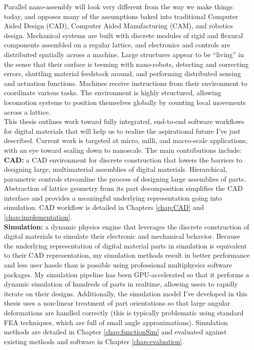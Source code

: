 {Parallel nano-assembly will look very different from the way we make things today, and opposes many of the assumptions baked into traditional Computer Aided Design (CAD),  Computer Aided Manufacturing (CAM), and robotics design.  Mechanical systems are built with discrete modules of rigid and flexural components assembled on a regular lattice, and electronics and controls are distributed spatially across a machine.  Large structures appear to be ``living'' in the sense that their surface is teeming with nano-robots, detecting and correcting errors, shuttling material feedstock around, and performing distributed sensing and actuation functions.  Machines receive instructions from their environment to coordinate various tasks.  The environment is highly structured, allowing locomotion systems to position themselves globally by counting local movements across a lattice.  %
\\

This thesis outlines work toward fully integrated, end-to-end software workflows for digital materials that will help us to realize the aspirational future I've just described.  Current work is targeted at micro, milli, and macro-scale applications, with an eye toward scaling down to nanoscale.  The main contributions include:\\

\textbf{CAD:} a CAD environment for discrete construction that lowers the barriers to designing large, multimaterial assemblies of digital materials.  Hierarchical, parametric controls streamline the process of designing large assemblies of parts.   Abstraction of lattice geometry from its part decomposition simplifies the CAD interface and provides a meaningful underlying representation going into simulation.  CAD workflow is detailed in Chapters \ref{chap:CAD} and \ref{chap:implementation}.\\

\textbf{Simulation:} a dynamic physics engine that leverages the discrete construction of digital materials to simulate their electronic and mechanical behavior.  Because the underlying representation of digital material parts in simulation is equivalent to their CAD representation, my simulation methods result in better performance and less user hassle than is possible using professional multiphysics software packages.  My simulation pipeline has been GPU-accelerated so that it performs a dynamic simulation of hundreds of parts in realtime, allowing users to rapidly iterate on their designs.  Additionally, the simulation model I've developed in this thesis uses a non-linear treatment of part orientations so that large angular deformations are handled correctly (this is typically problematic using standard FEA techniques, which are full of small angle approximations).  Simulation methods are detailed in Chapter \ref{chap:functionSim} and evaluated against existing methods and software in Chapter \ref{chap:evaluation}.\\

}
